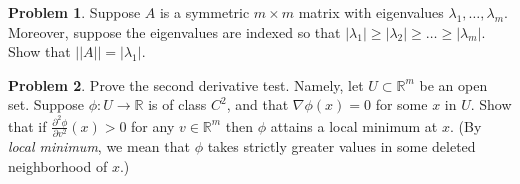 \documentclass{amsart}
\newcommand{\+}[1]{\ensuremath{\mathbf{#1}}}
\newcommand{\R}{{\mathbb R}}
\theoremstyle{definition}
\newtheorem{prob}{Problem}
\begin{document}
\begin{prob}
 Suppose $A$ is a symmetric $m \times m$ matrix with eigenvalues $\lambda_1, \ldots, \lambda_m$.
 Moreover, suppose the eigenvalues are indexed so that $|\lambda_1| \geq |\lambda_2| \geq \ldots \geq |\lambda_m|$.
 Show that $||A|| = |\lambda_1|$.
\end{prob}


\begin{prob}
 Prove the second derivative test.  Namely, let $U \subset \R^m$ be an open set.
 Suppose $\phi: U \to \R$ is of class $C^2$, and that $\nabla \phi (x) = 0$
 for some $x$ in $U$.
 Show that if $\frac{\partial^2 \phi}{\partial v^2}(x) > 0$ for any $v \in \R^m$
 then $\phi$ attains a local minimum at $x$.
 (By \emph{local minimum}, we mean that $\phi$ takes strictly greater values in some deleted neighborhood of $x$.)
\end{prob}
\end{document}
